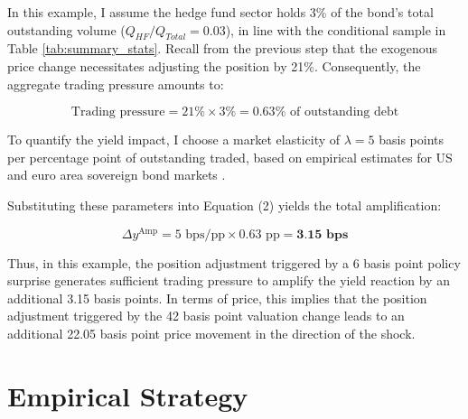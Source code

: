 \documentclass[english, 11pt, oneside]{article}
\begin{document}
In this example, I assume the hedge fund sector holds 3\% of the bond's total outstanding volume ($Q_{HF}/Q_{Total} = 0.03$), in line with the conditional sample in Table \ref{tab:summary_stats}. Recall from the previous step that the exogenous price change necessitates adjusting the position by 21\%. Consequently, the aggregate trading pressure amounts to:

\begin{equation*}
\text{Trading pressure} = 21\% \times 3\% = 0.63\% \text{ of outstanding debt}
\end{equation*}

To quantify the yield impact, I choose a market elasticity of $\lambda = 5$ basis points per percentage point of outstanding traded, based on empirical estimates for US and euro area sovereign bond markets \citep{damico2013, eser2016, desantis2020}.

Substituting these parameters into Equation (2) yields the total amplification:

\begin{equation*}
\Delta y^{\text{Amp}} = 5 \text{ bps/pp} \times 0.63 \text{ pp} = \textbf{3.15 bps}
\end{equation*}

Thus, in this example, the position adjustment triggered by a 6 basis point policy surprise generates sufficient trading pressure to amplify the yield reaction by an additional 3.15 basis points. In terms of price, this implies that the position adjustment triggered by the 42 basis point valuation change leads to an additional 22.05 basis point price movement in the direction of the shock.





\section{Empirical Strategy}
\label{sec:empirical_strategy}
\end{document}
